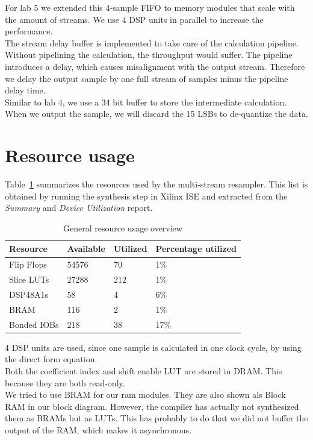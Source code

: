 \documentclass[a4paper,twoside,11pt, fleqn]{article}
\begin{document}
For lab 5 we extended this 4-sample FIFO to memory modules that scale with the amount of streams. We use 4 DSP units in parallel to increase the performance.\\

The stream delay buffer is implemented to take care of the calculation pipeline. Without pipelining the calculation, the throughput would suffer. The pipeline introduces a delay, which causes misalignment with the output stream. Therefore we delay the output sample by one full stream of samples minus the pipeline delay time.\\

Similar to lab 4, we use a 34 bit buffer to store the intermediate calculation. When we output the sample, we will discard the 15 LSBs to de-quantize the data.

\newpage
\section{Resource usage}
Table~\ref{tab:3ausage} summarizes the resources used by the multi-stream resampler. This list is obtained by running the synthesis step in Xilinx ISE and extracted from the \textit{Summary} and \textit{Device Utilization} report.

\begin{table}[h]
\begin{tabular}{|l|l|l|l|}
\hline
\textbf{Resource} & \textbf{Available} & \textbf{Utilized} & \textbf{Percentage utilized}\\
\hline
Flip Flops	& 54576 & 70 	& 1\%\\
Slice LUTs 	& 27288 & 212 	& 1\%\\
DSP48A1s	& 58 	& 4 	& 6\%\\
BRAM		& 116 	& 2 	& 1\%\\
Bonded IOBs	& 218 	& 38	& 17\%\\
\hline
\end{tabular}
\caption{General resource usage overview}
\label{tab:3ausage}
\end{table} 

4 DSP units are used, since one sample is calculated in one clock cycle, by using the direct form equation.\\

Both the coefficient index and shift enable LUT are stored in DRAM. This because they are both read-only. \\

We tried to use BRAM for our ram modules. They are also shown als Block RAM in our block diagram. However, the compiler has actually not synthesized them as BRAMs but as LUTs. This has probably to do that we did not buffer the output of the RAM, which makes it asynchronous.\\
\end{document}
